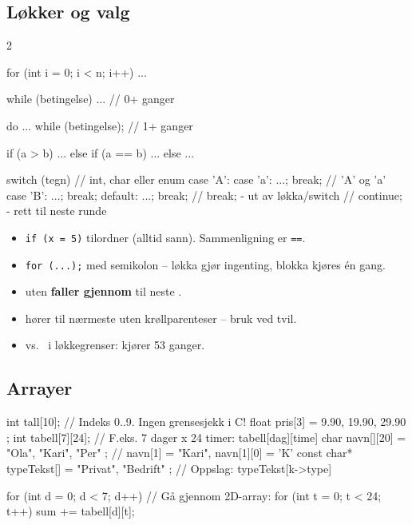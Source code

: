 \subsection{Løkker og valg}
\begin{multicols}{2}
\begin{kode}
for (int i = 0;  i < n;  i++)  { ... }

while (betingelse)  { ... }   //  0+ ganger

do  { ... } while (betingelse);  //  1+ ganger

if (a > b)  ...
else if (a == b)  ...
else  ...
\end{kode}
\columnbreak
\begin{kode}
switch (tegn)  {     //  int, char eller enum
  case 'A':
  case 'a':  ...;  break;  //  'A' og 'a'
  case 'B':  ...;  break;
  default:   ...;  break;
}
//  break;    - ut av løkka/switch
//  continue; - rett til neste runde
\end{kode}
\end{multicols}

\begin{felle}[{Klassikere}]
\begin{itemize}
  \item \lstinline|if (x = 5)| tilordner (alltid sann). Sammenligning er \lstinline|==|.
  \item \lstinline|for (...);| med semikolon -- løkka gjør ingenting, blokka kjøres én gang.
  \item {} uten  \textbf{faller gjennom} til neste .
  \item {} hører til nærmeste  uten krøllparenteser -- bruk \cc{\{ \}} ved tvil.
  \item \cc{<} vs.\ \cc{<=} i løkkegrenser:  kjører 53 ganger.
\end{itemize}
\end{felle}

\subsection{Arrayer}
\begin{kode}
int   tall[10];                      //  Indeks 0..9. Ingen grensesjekk i C!
float pris[3] = { 9.90, 19.90, 29.90 };
int   tabell[7][24];                 //  F.eks. 7 dager x 24 timer:  tabell[dag][time]
char  navn[][20] = { "Ola", "Kari", "Per" };   //  navn[1] = "Kari",  navn[1][0] = 'K'
const char* typeTekst[] = { "Privat", "Bedrift" };  //  Oppslag: typeTekst[k->type]

for (int d = 0;  d < 7;  d++)        //  Gå gjennom 2D-array:
  for (int t = 0;  t < 24;  t++)
    sum += tabell[d][t];
\end{kode}
